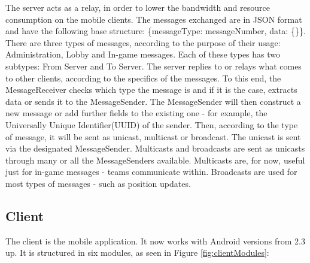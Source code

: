The server acts as a relay, in order to lower the bandwidth and
resource consumption on the mobile clients. The messages exchanged are in
JSON format and have the following base structure: \{messageType: messageNumber,
data: \{\}\}. There are three types of messages, according to the purpose of
their usage: Administration, Lobby and In-game messages. Each of these types has
two subtypes: From Server and To Server. The server replies to or relays what
comes to other clients, according to the specifics of the messages. To this
end, the MessageReceiver checks which type the message is and if it is the case, extracts
data or sends it to the MessageSender. The MessageSender will then construct a
new message or add further fields to the existing one - for example, the
Universally Unique Identifier(UUID) of the sender. Then, according to the type
of message, it will be sent as unicast, multicast or broadcast. The unicast is
sent via the designated MessageSender. Multicasts and broadcasts are sent as
unicasts through many or all the MessageSenders available. Multicasts are, for
now, useful just for in-game messages - teams communicate within. Broadcasts are
used for most types of messages - such as position updates.\newline

\subsection{Client}

The client is the mobile application. It now works with Android versions from
2.3 up. It is structured in six modules, as seen in Figure \ref{fig:clientModules}:

